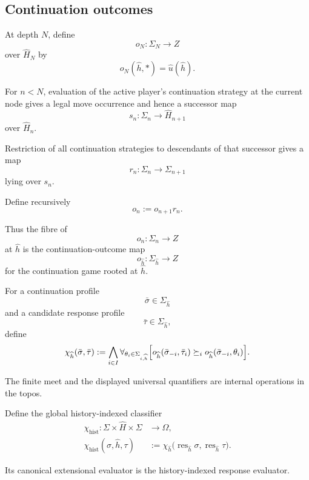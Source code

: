 \subsection{Continuation outcomes}

At depth \(N\), define
\[
  o_N:\Sigma_N\to Z
\]
over \(\widehat H_N\) by
\[
  o_N(\widehat h,*)=\widehat u(\widehat h).
\]

For \(n<N\), evaluation of the active player's continuation strategy at the current node gives a
legal move occurrence and hence a successor map
\[
  s_n:\Sigma_n\to\widehat H_{n+1}
\]
over \(\widehat H_n\).

Restriction of all continuation strategies to descendants of that successor gives a map
\[
  r_n:\Sigma_n\to\Sigma_{n+1}
\]
lying over \(s_n\).

Define recursively
\[
  o_n:=o_{n+1}r_n.
\]

Thus the fibre of
\[
  o_n:\Sigma_n\to Z
\]
at \(\widehat h\) is the continuation-outcome map
\[
  o_{\widehat h}:\Sigma_{\widehat h}\to Z
\]
for the continuation game rooted at \(\widehat h\).

For a continuation profile
\[
  \bar\sigma\in\Sigma_{\widehat h}
\]
and a candidate response profile
\[
  \bar\tau\in\Sigma_{\widehat h},
\]
define
\[
\begin{aligned}
  \chi_{\widehat h}(\bar\sigma,\bar\tau)
  :=
  \bigwedge_{i\in I}
  \forall_{\theta_i\in\Sigma_{i,\widehat h}}
  \Bigl[
    o_{\widehat h}(\bar\sigma_{-i},\bar\tau_i)
    \succeq_i
    o_{\widehat h}(\bar\sigma_{-i},\theta_i)
  \Bigr].
\end{aligned}
\]

The finite meet and the displayed universal quantifiers are internal operations in the topos.

Define the global history-indexed classifier
\[
\begin{aligned}
  \chi_{\mathrm{hist}}:
  \Sigma\times\widehat H\times\Sigma
  &\longrightarrow
  \Omega,
  \\
  \chi_{\mathrm{hist}}(\sigma,\widehat h,\tau)
  &:=
  \chi_{\widehat h}
  \bigl(
    \operatorname{res}_{\widehat h}\sigma,
    \operatorname{res}_{\widehat h}\tau
  \bigr).
\end{aligned}
\]

Its canonical extensional evaluator is the history-indexed response evaluator.

